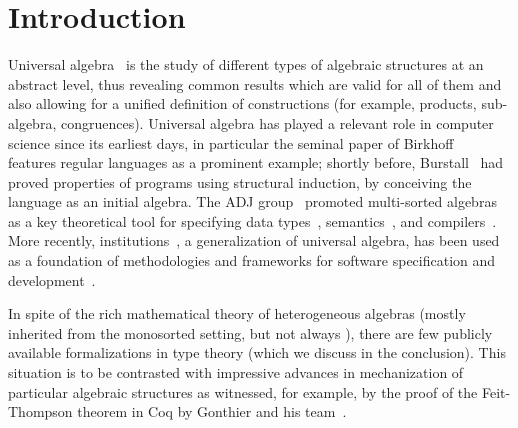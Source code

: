 \section{Introduction}

Universal algebra~\cite{birkhoff-1935} is the study of different types
of algebraic structures at an abstract level, thus revealing common
results which are valid for all of them and also allowing for a
unified definition of constructions (for example, products,
sub-algebra, congruences). Universal algebra has played a relevant
role in computer science since its earliest days, in particular the
seminal paper of Birkhoff~\cite{birkhoff-70} features regular
languages as a prominent example; shortly before,
Burstall~\cite{burstall69} had proved properties of programs using
structural induction, by conceiving the language as an
initial algebra. The ADJ group~\cite{goguen-adj} promoted multi-sorted algebras as a
key theoretical tool for specifying data
types~\cite{adj-abstract-data-types}, semantics~\cite{goguen-77}, and
compilers~\cite{thatcher1981more}.  More recently,
institutions~\cite{goguen-92}, a generalization of universal algebra,
has been used as a foundation of methodologies and frameworks for
software specification and development~\cite{sannella2012foundations}.

In spite of the rich mathematical theory of heterogeneous algebras
(mostly inherited from the monosorted setting, but not always
\cite{tarlecki-nuances}), there are few publicly available
formalizations in type theory (which we discuss in the conclusion).
This situation is to be contrasted with impressive advances in
mechanization of particular algebraic structures as witnessed, for
example, by the proof of the Feit-Thompson theorem in Coq by Gonthier
and his team~\cite{gonthier2013machine}.

